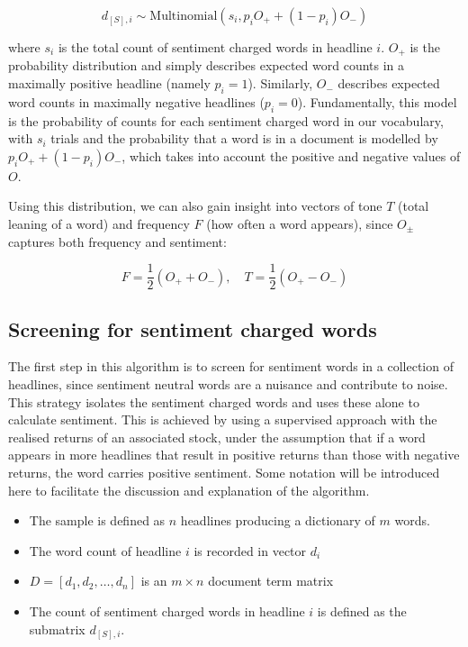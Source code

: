 \begin{equation}
d_{[S],i} \sim \text{Multinomial}(s_i, p_iO_+ + (1-p_i)O_-)
\label{multinom}
\end{equation}

\noindent
where $s_i$ is the total count of sentiment charged words in headline $i$. $O_+$ is the probability distribution and simply describes expected word counts in a maximally positive headline (namely $p_i = 1$). Similarly, $O_-$ describes expected word counts in maximally negative headlines ($p_i = 0$). Fundamentally, this model is the probability of counts for each sentiment charged word in our vocabulary, with $s_i$ trials and the probability that a word is in a document is modelled by $p_iO_+ + (1-p_i)O_-$, which takes into account the positive and negative values of $O$.

Using this distribution, we can also gain insight into vectors of tone $T$ (total leaning of a word) and frequency $F$ (how often a word appears), since $O_\pm$ captures both frequency and sentiment:

\begin{equation}
F = \frac{1}{2}(O_+ + O_-), \quad T= \frac{1}{2}(O_+ - O_-)
\end{equation}

\subsection{Screening for sentiment charged words}
\label{screen-sentiment}
The first step in this algorithm is to screen for sentiment words in a collection of headlines, since sentiment neutral words are a nuisance and contribute to noise. This strategy isolates the sentiment charged words and uses these alone to calculate sentiment. This is achieved by using a supervised approach with the realised returns of an associated stock, under the assumption that if a word appears in more headlines that result in positive returns than those with negative returns, the word carries positive sentiment. Some notation will be introduced here to facilitate the discussion and explanation of the algorithm.
\begin{itemize}
      \item The sample is defined as $n$ headlines producing a dictionary of $m$ words.
      \item The word count of headline $i$ is recorded in vector $d_i$
      \item $D = [d_1, d_2, \dots, d_n]$ is an $m \times n$ document term matrix
      \item The count of sentiment charged words in headline $i$ is defined as the submatrix $d_{[S],i}$.
\end{itemize}

